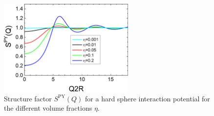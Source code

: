 \begin{figure}[htb]
\begin{center}
\includegraphics[width=0.6\textwidth]{../images/structure_factor/HardSphere/SQPY.png}
\end{center}
\caption{Structure factor $S^\mathrm{PY}(Q)$ for a hard sphere interaction potential for the different volume fractions $\eta$.}
\label{fig:SQPYHardSphere}
\end{figure}

\clearpage
